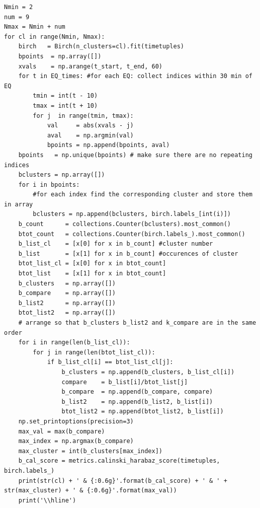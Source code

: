 \documentclass[colorlinks=true,pdfstartview=FitV,linkcolor=blue,
            citecolor=red,urlcolor=magenta]{ligodoc}
\begin{document}
\begin{verbatim}
Nmin = 2
num = 9
Nmax = Nmin + num  
for cl in range(Nmin, Nmax):
    birch   = Birch(n_clusters=cl).fit(timetuples)
    bpoints  = np.array([])
    xvals    = np.arange(t_start, t_end, 60)
    for t in EQ_times: #for each EQ: collect indices within 30 min of EQ
        tmin = int(t - 10)
        tmax = int(t + 10)
        for j  in range(tmin, tmax):
            val     = abs(xvals - j)
            aval    = np.argmin(val)
            bpoints = np.append(bpoints, aval)
    bpoints   = np.unique(bpoints) # make sure there are no repeating indices
    bclusters = np.array([])
    for i in bpoints:
        #for each index find the corresponding cluster and store them in array
        bclusters = np.append(bclusters, birch.labels_[int(i)])
    b_count      = collections.Counter(bclusters).most_common()
    btot_count   = collections.Counter(birch.labels_).most_common()
    b_list_cl    = [x[0] for x in b_count] #cluster number
    b_list       = [x[1] for x in b_count] #occurences of cluster
    btot_list_cl = [x[0] for x in btot_count]
    btot_list    = [x[1] for x in btot_count]
    b_clusters   = np.array([])
    b_compare    = np.array([])
    b_list2      = np.array([])
    btot_list2   = np.array([])
    # arrange so that b_clusters b_list2 and k_compare are in the same order
    for i in range(len(b_list_cl)):
        for j in range(len(btot_list_cl)):
            if b_list_cl[i] == btot_list_cl[j]:
                b_clusters = np.append(b_clusters, b_list_cl[i])
                compare    = b_list[i]/btot_list[j]
                b_compare  = np.append(b_compare, compare)
                b_list2    = np.append(b_list2, b_list[i])
                btot_list2 = np.append(btot_list2, b_list[i])
    np.set_printoptions(precision=3)
    max_val = max(b_compare)
    max_index = np.argmax(b_compare)
    max_cluster = int(b_clusters[max_index])
    b_cal_score = metrics.calinski_harabaz_score(timetuples, birch.labels_)
    print(str(cl) + ' & {:0.6g}'.format(b_cal_score) + ' & ' + str(max_cluster) + ' & {:0.6g}'.format(max_val))
    print('\\hline')
\end{verbatim}
\end{document}
